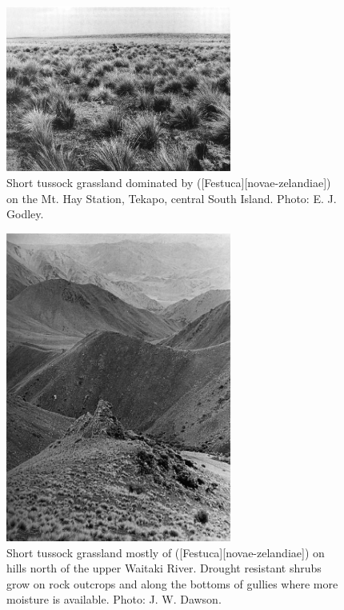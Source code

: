 \begin{figure}
	\includegraphics[width=0.66\textwidth]{graphics/figure81short-tussock.jpg}
	\centering
		\caption[Short tussock grassland dominated by fescue-tussock]{Short tussock grassland dominated by  ([Festuca][novae-zelandiae]) on the Mt. Hay Station, Tekapo, central South Island.
		Photo:  E. J. Godley.}%
		\label{fig:81short-tussock}
\end{figure}
\begin{figure}
	\includegraphics[width=0.66\textwidth]{graphics/figure82short-tussock.jpg}
	\centering
		\caption[Short tussock grassland mostly of \emph{Festuca novae-zelandiae}]{Short tussock grassland mostly of  ([Festuca][novae-zelandiae]) on hills north of the upper Waitaki River.
		Drought resistant shrubs grow on rock outcrops and along the bottoms of gullies where more moisture is available.  Photo:  J. W. Dawson.}%
		\label{fig:82short-tussock}
\end{figure}
